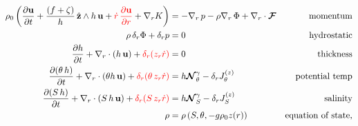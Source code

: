 \documentclass[11pt]{article}
\begin{document}
\begin{alignat}{2}
\rho_0 \left( \frac{\partial \mathbf{u}}{\partial t} + \frac{( f + \zeta )}{h} \, \hat{\mathbf{z}} \wedge h \, \mathbf{u} + { \color{red} \dot{r} \, \frac{\partial \mathbf{u}}{\partial r} } + \nabla_r K \right) &= -\nabla_r \, p - \rho \nabla_r \, \Phi + \nabla_r \cdot \boldsymbol{\mathcal{F}}
&\mbox{momentum} \label{eq:h-horz-momentum} \\
\rho \, \delta_r \Phi + \delta_r p &= 0
&\mbox{hydrostatic} \label{eq:h-hydrostatic-equation} \\
\frac{\partial h}{\partial t} + \nabla_r \cdot \left( h \, \mathbf{u} \right) + {\color{red} \delta_r ( z_r \dot{r} ) } &= 0
&\mbox{thickness} \label{eq:h-thickness-equation} \\
\frac{\partial ( \theta \, h )}{\partial t} + \nabla_r \cdot \left( \theta h \, \mathbf{u} \right) + {\color{red} \delta_r ( \theta \, z_r \dot{r} ) } &=  h \boldsymbol{\mathcal{N}}_\theta^\gamma - \delta_r J_\theta^{(z)}
&\mbox{potential temp} \label{eq:h-temperature-equation} \\
\frac{\partial ( S \, h )}{\partial t} + \nabla_r \cdot \left( S \, h \, \mathbf{u} \right) + {\color{red} \delta_r ( S \, z_r \dot{r} ) } &= h \boldsymbol{\mathcal{N}}_S^\gamma - \delta_r J_S^{(z)}
&\mbox{salinity} \label{eq:h-salinity-equation} \\
\rho &= \rho\left( S, \theta, -g \rho_0 z(r) \right)
&\mbox{equation of state,}
\label{eq:h-equation-of-state}
\end{alignat}
\end{document}

